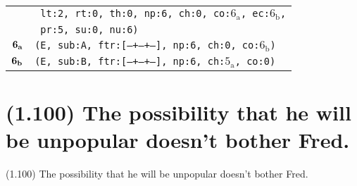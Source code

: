 \documentclass{article}
\begin{document}
\begin{minipage}{\textwidth}
{\begin{tabular}{|r|l|}
    & \texttt{\texttt{~lt:2,~rt:0,~th:0,~np:6,~ch:0,~co:${\textrm{6}_{\textrm{a}}}$,~ec:${\textrm{6}_{\textrm{b}}}$,}} \\
    & \texttt{\texttt{~pr:5,~su:0,~nu:6)}} \\
    ${\textbf{\textrm{6}}_{\textbf{\textrm{a}}}}$ & \texttt{\texttt{(E,~sub:A,~ftr:[---+--+--],~np:6,~ch:0,~co:${\textrm{6}_{\textrm{b}}}$)}} \\
    ${\textbf{\textrm{6}}_{\textbf{\textrm{b}}}}$ & \texttt{\texttt{(E,~sub:B,~ftr:[---+--+--],~np:6,~ch:${\textrm{5}_{\textrm{a}}}$,~co:0)}} \\
    \hline
  \end{tabular}
  }
\end{minipage}
\bigbreak

\clearpage

%
%

\section*{(1.100) The possibility that he will be unpopular doesn’t bother Fred.}

\bigbreak
\begin{enumerate*}
\item[(1.100)] The possibility that he will be unpopular doesn’t bother Fred.
\end{enumerate*}
\bigbreak
\end{document}
